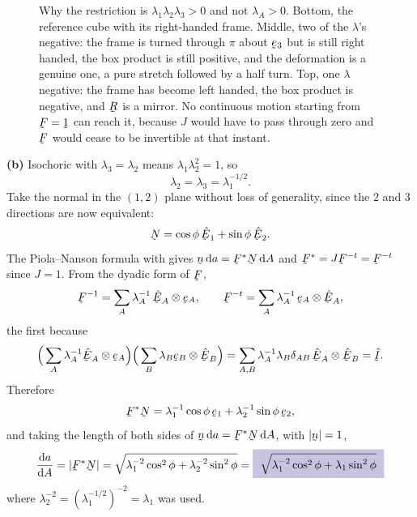 \begin{solution}
\begin{figure}[htbp]
\caption{Why the restriction is $\lambda_{1}\lambda_{2}\lambda_{3}>0$ and
not $\lambda_{A}>0$. Bottom, the reference cube with its right-handed
frame. Middle, two of the $\lambda$'s negative: the frame is turned
through $\pi$ about $\be_{3}$ but is still right handed, the box product
is still positive, and the deformation is a genuine one, a pure stretch
followed by a half turn. Top, one $\lambda$ negative: the frame has become
left handed, the box product is negative, and $\bR$ is a mirror. No
continuous motion starting from $\bF=\shift$ can reach it, because $J$
would have to pass through zero and $\bF$ would cease to be invertible at
that instant.}
\label{fig:signs}
\end{figure}

\textbf{(b)} Isochoric with $\lambda_{3}=\lambda_{2}$ means
$\lambda_{1}\lambda_{2}^{2}=1$, so
\[
   \lambda_{2}=\lambda_{3}=\lambda_{1}^{-1/2}.
\]
Take the normal in the $(1,2)$ plane without loss of generality, since the
$2$ and $3$ directions are now equivalent:
\[
   \bN=\cos\phi\,\hbE_{1}+\sin\phi\,\hbE_{2}.
\]
The Piola--Nanson formula  with  gives
$\bn\,\dl a=\bF^{*}\bN\,\dl A$ and $\bF^{*}=J\bF^{-t}=\bF^{-t}$ since
$J=1$. From the dyadic form of $\bF$,
\[
   \bF^{-1}=\sum_{A}\lambda_{A}^{-1}\,\hbE_{A}\otimes\be_{A},
   \qquad
   \bF^{-t}=\sum_{A}\lambda_{A}^{-1}\,\be_{A}\otimes\hbE_{A},
\]
the first because
\[
   \Big(\sum_{A}\lambda_{A}^{-1}\hbE_{A}\otimes\be_{A}\Big)
   \Big(\sum_{B}\lambda_{B}\be_{B}\otimes\hbE_{B}\Big)
   =\sum_{A,B}\lambda_{A}^{-1}\lambda_{B}\dd_{AB}
    \,\hbE_{A}\otimes\hbE_{B}=\hI .
\]
Therefore
\[
   \bF^{*}\bN=\lambda_{1}^{-1}\cos\phi\,\be_{1}
             +\lambda_{2}^{-1}\sin\phi\,\be_{2},
\]
and taking the length of both sides of $\bn\,\dl a=\bF^{*}\bN\,\dl A$,
with $|\bn|=1$,
\[
   \frac{\dl a}{\dl A}=|\bF^{*}\bN|
   =\sqrt{\lambda_{1}^{-2}\cos^{2}\phi+\lambda_{2}^{-2}\sin^{2}\phi}
   =\boxed{\ \sqrt{\lambda_{1}^{-2}\cos^{2}\phi+\lambda_{1}\sin^{2}\phi}\ }
\]
where $\lambda_{2}^{-2}=(\lambda_{1}^{-1/2})^{-2}=\lambda_{1}$ was used.


\end{solution}
